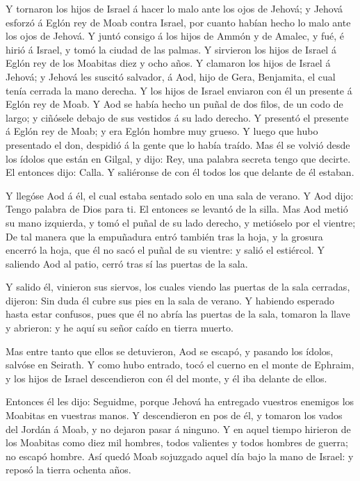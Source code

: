 Y tornaron los hijos de Israel á hacer lo malo ante los
ojos de Jehová; y Jehová esforzó á Eglón rey de Moab contra Israel, por
cuanto habían hecho lo malo ante los ojos de Jehová.  Y
juntó consigo á los hijos de Ammón y de Amalec, y fué, é hirió á Israel,
y tomó la ciudad de las palmas.  Y sirvieron los hijos de
Israel á Eglón rey de los Moabitas diez y ocho años.  Y
clamaron los hijos de Israel á Jehová; y Jehová les suscitó salvador, á
Aod, hijo de Gera, Benjamita, el cual tenía cerrada la mano derecha. Y
los hijos de Israel enviaron con él un presente á Eglón rey de Moab.
 Y Aod se había hecho un puñal de dos filos, de un codo
de largo; y ciñósele debajo de sus vestidos á su lado derecho.
 Y presentó el presente á Eglón rey de Moab; y era Eglón
hombre muy grueso.  Y luego que hubo presentado el don,
despidió á la gente que lo había traído.  Mas él se
volvió desde los ídolos que están en Gilgal, y dijo: Rey, una palabra
secreta tengo que decirte. El entonces dijo: Calla. Y saliéronse de con
él todos los que delante de él estaban.

 Y llegóse Aod á él, el cual estaba sentado solo en una
sala de verano. Y Aod dijo: Tengo palabra de Dios para ti. El entonces
se levantó de la silla.  Mas Aod metió su mano izquierda,
y tomó el puñal de su lado derecho, y metióselo por el vientre;
 De tal manera que la empuñadura entró también tras la
hoja, y la grosura encerró la hoja, que él no sacó el puñal de su
vientre: y salió el estiércol.  Y saliendo Aod al patio,
cerró tras sí las puertas de la sala.

 Y salido él, vinieron sus siervos, los cuales viendo las
puertas de la sala cerradas, dijeron: Sin duda él cubre sus pies en la
sala de verano.  Y habiendo esperado hasta estar
confusos, pues que él no abría las puertas de la sala, tomaron la llave
y abrieron: y he aquí su señor caído en tierra muerto.

 Mas entre tanto que ellos se detuvieron, Aod se escapó,
y pasando los ídolos, salvóse en Seirath.  Y como hubo
entrado, tocó el cuerno en el monte de Ephraim, y los hijos de Israel
descendieron con él del monte, y él iba delante de ellos.

 Entonces él les dijo: Seguidme, porque Jehová ha
entregado vuestros enemigos los Moabitas en vuestras manos. Y
descendieron en pos de él, y tomaron los vados del Jordán á Moab, y no
dejaron pasar á ninguno.  Y en aquel tiempo hirieron de
los Moabitas como diez mil hombres, todos valientes y todos hombres de
guerra; no escapó hombre.  Así quedó Moab sojuzgado aquel
día bajo la mano de Israel: y reposó la tierra ochenta años.

